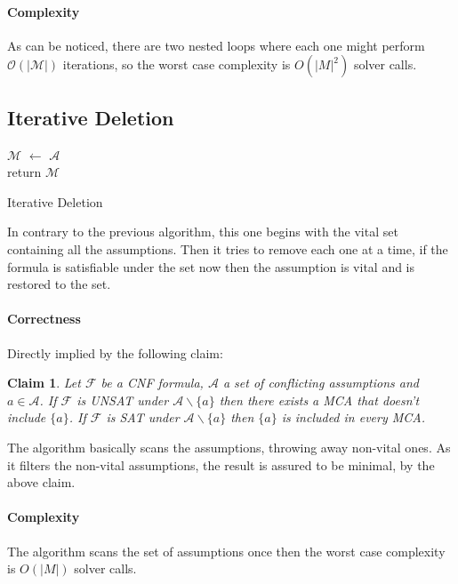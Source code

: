 \documentclass[]{article}
\newtheorem{claim}  {Claim}
\begin{document}
	\paragraph{Complexity} As can be noticed, there are two nested loops where each one might perform $ \mathcal{O \left( | M |\right) } $ iterations, so the worst case complexity is $ O \left( | M |^\text{2} \right) $ solver calls.
	
	
	\subsection{Iterative Deletion}
		\begin{algorithm}[H]
			$ \mathcal{M} $ $\leftarrow$ $ \mathcal{A} $\\
			return $ \mathcal{M} $
			\caption{Iterative Deletion}
		\end{algorithm}
		In contrary to the previous algorithm, this one begins with the vital set containing all the assumptions. Then it tries to remove each one at a time, if the formula is satisfiable under the set now then the assumption is vital and is restored to the set.
		
		\paragraph{Correctness} Directly implied by the following claim:
		\begin{claim}
			Let $ \mathcal{F} $ be a CNF formula, $ \mathcal{A} $ a set of conflicting assumptions and $  a \in \mathcal{A} $. If $ \mathcal{F} $ is UNSAT under $ \mathcal{A} \backslash \{a\} $ then there exists a MCA that doesn't include $ \{a\} $. If $ \mathcal{F} $ is SAT under $ \mathcal{A} \backslash \{a\} $ then $ \{a\} $ is included in every MCA.
		\end{claim}
		The algorithm basically scans the assumptions, throwing away non-vital ones. As it filters the non-vital assumptions, the result is assured to be minimal, by the above claim.
		\paragraph{Complexity} The algorithm scans the set of assumptions once then the worst case complexity is $ O \left( | M | \right)  $ solver calls.
		
\end{document}

